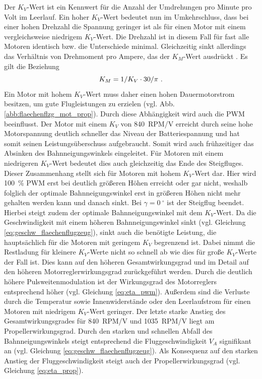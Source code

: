 Der \ensuremath{K_V}-Wert ist ein Kennwert für die Anzahl der Umdrehungen pro Minute pro Volt im Leerlauf. Ein hoher \ensuremath{K_V}-Wert bedeutet nun im Umkehrschluss, dass bei einer hohen Drehzahl die Spannung geringer ist als für einen Motor mit einem vergleichsweise niedrigem \ensuremath{K_V}-Wert. Die Drehzahl ist in diesem Fall für fast alle Motoren identisch bzw. die Unterschiede minimal. Gleichzeitig sinkt allerdings das Verhältnis von Drehmoment pro Ampere, das der \ensuremath{K_M}-Wert ausdrückt  \cite[S.35 und S.42-43]{Buchi.2013}. Es gilt die Beziehung
\begin{equation}
	K_M = 1/K_V\cdot 30/\pi ~\text{.}
\end{equation}
Ein Motor mit hohem \ensuremath{K_V}-Wert muss daher einen hohen Dauermotorstrom besitzen, um gute Flugleistungen zu erzielen (vgl. Abb. \ref{abb:flaechenflzg_mot_prop}). Durch diese Abhängigkeit wird auch die PWM beeinflusst. Der Motor mit einem \ensuremath{K_V} von \SI{840}{RPM/V} erreicht durch seine hohe Motorspannung deutlich schneller das Niveau der Batteriespannung und hat somit seinen Leistungsüberschuss aufgebraucht. Somit wird auch frühzeitiger das Absinken des Bahnneigungswinkels eingeleitet. Für Motoren mit einem niedrigeren \ensuremath{K_V}-Wert bedeutet dies auch gleichzeitig das Ende des Steigfluges. \\
Dieser Zusammenhang stellt sich für Motoren mit hohem \ensuremath{K_V}-Wert dar. Hier wird \SI{100}{\%} PWM erst bei deutlich größeren Höhen erreicht oder gar nicht, weshalb folglich der optimale Bahnneigungswinkel erst in größeren Höhen nicht mehr gehalten werden kann und danach sinkt. Bei \ensuremath{\gamma = \SI{0}{^\circ}} ist der Steigflug beendet. Hierbei steigt zudem der optimale Bahnneigungswinkel mit dem \ensuremath{K_V}-Wert. Da die Geschwindigkeit mit einem höheren Bahnneigungswinkel sinkt (vgl. Gleichung \eqref{eq:geschw_flaechenflugzeug}), sinkt auch die benötigte Leistung, die hauptsächlich für die Motoren mit geringem \ensuremath{K_V} begrenzend ist. Dabei nimmt die Restladung für kleinere \ensuremath{K_V}-Werte nicht so schnell ab wie dies für große \ensuremath{K_V}-Werte der Fall ist. Dies kann auf den höheren Gesamtwirkungsgrad und im Detail auf den höheren Motorreglerwirkungsgrad zurückgeführt werden. Durch die deutlich höhere Pulsweitenmodulation ist der Wirkungsgrad des Motorreglers entsprechend höher (vgl. Gleichung \eqref{eq:eta_pwm}). Außerdem sind die Verluste durch die Temperatur sowie Innenwiderstände oder den Leerlaufstrom für einen Motoren mit niedrigem \ensuremath{K_V}-Wert geringer. Der letzte starke Anstieg des Gesamtwirkungsgrades für \SI{840}{RPM/V} und \SI{1035}{RPM/V} liegt am Propellerwirkungsgrad. Durch den starken und schnellen Abfall des Bahnneigungswinkels steigt entsprechend die Fluggeschwindigkeit \ensuremath{V_A} signifikant an (vgl. Gleichung \eqref{eq:geschw_flaechenflugzeug}). Als Konsequenz auf den starken Anstieg der Fluggeschwindigkeit steigt auch der Propellerwirkungsgrad (vgl. Gleichung \eqref{eq:eta_prop}). \\
